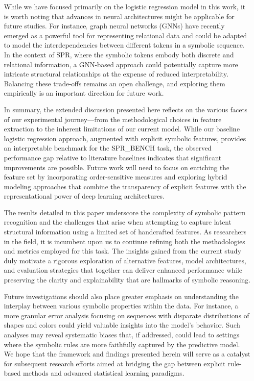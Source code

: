 \documentclass{article}
\begin{document}
While we have focused primarily on the logistic regression model in this work, it is worth noting that advances in neural architectures might be applicable for future studies. For instance, graph neural networks (GNNs) have recently emerged as a powerful tool for representing relational data and could be adapted to model the interdependencies between different tokens in a symbolic sequence. In the context of SPR, where the symbolic tokens embody both discrete and relational information, a GNN-based approach could potentially capture more intricate structural relationships at the expense of reduced interpretability. Balancing these trade-offs remains an open challenge, and exploring them empirically is an important direction for future work.

In summary, the extended discussion presented here reflects on the various facets of our experimental journey—from the methodological choices in feature extraction to the inherent limitations of our current model. While our baseline logistic regression approach, augmented with explicit symbolic features, provides an interpretable benchmark for the SPR\_BENCH task, the observed performance gap relative to literature baselines indicates that significant improvements are possible. Future work will need to focus on enriching the feature set by incorporating order-sensitive measures and exploring hybrid modeling approaches that combine the transparency of explicit features with the representational power of deep learning architectures.

The results detailed in this paper underscore the complexity of symbolic pattern recognition and the challenges that arise when attempting to capture latent structural information using a limited set of handcrafted features. As researchers in the field, it is incumbent upon us to continue refining both the methodologies and metrics employed for this task. The insights gained from the current study duly motivate a rigorous exploration of alternative features, model architectures, and evaluation strategies that together can deliver enhanced performance while preserving the clarity and explainability that are hallmarks of symbolic reasoning.

Future investigations should also place greater emphasis on understanding the interplay between various symbolic properties within the data. For instance, a more granular error analysis focusing on sequences with disparate distributions of shapes and colors could yield valuable insights into the model’s behavior. Such analyses may reveal systematic biases that, if addressed, could lead to settings where the symbolic rules are more faithfully captured by the predictive model. We hope that the framework and findings presented herein will serve as a catalyst for subsequent research efforts aimed at bridging the gap between explicit rule-based methods and advanced statistical learning paradigms.
\end{document}
